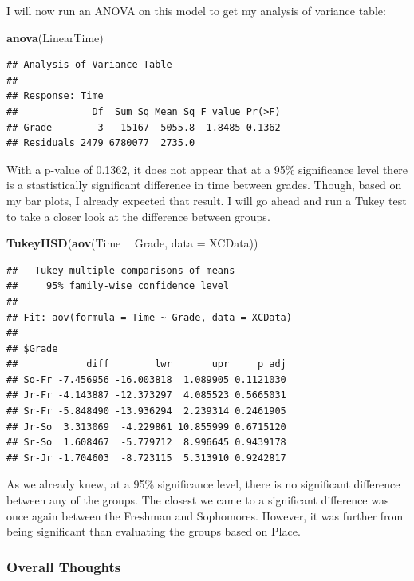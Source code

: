 \documentclass[
]{article}
\newenvironment{Shaded}{\begin{snugshade}}{\end{snugshade}}
\newcommand{\DataTypeTok}[1]{\textcolor[rgb]{0.13,0.29,0.53}{#1}}
\newcommand{\KeywordTok}[1]{\textcolor[rgb]{0.13,0.29,0.53}{\textbf{#1}}}
\newcommand{\NormalTok}[1]{#1}
\newcommand{\OperatorTok}[1]{\textcolor[rgb]{0.81,0.36,0.00}{\textbf{#1}}}
\newcommand{\StringTok}[1]{\textcolor[rgb]{0.31,0.60,0.02}{#1}}
\begin{document}
I will now run an ANOVA on this model to get my analysis of variance
table:

\begin{Shaded}
\begin{Highlighting}[]
\KeywordTok{anova}\NormalTok{(LinearTime)}
\end{Highlighting}
\end{Shaded}

\begin{verbatim}
## Analysis of Variance Table
## 
## Response: Time
##             Df  Sum Sq Mean Sq F value Pr(>F)
## Grade        3   15167  5055.8  1.8485 0.1362
## Residuals 2479 6780077  2735.0
\end{verbatim}

With a p-value of 0.1362, it does not appear that at a 95\% significance
level there is a stastistically significant difference in time between
grades. Though, based on my bar plots, I already expected that result. I
will go ahead and run a Tukey test to take a closer look at the
difference between groups.

\begin{Shaded}
\begin{Highlighting}[]
\KeywordTok{TukeyHSD}\NormalTok{(}\KeywordTok{aov}\NormalTok{(Time }\OperatorTok{~}\StringTok{ }\NormalTok{Grade, }\DataTypeTok{data =}\NormalTok{ XCData))}
\end{Highlighting}
\end{Shaded}

\begin{verbatim}
##   Tukey multiple comparisons of means
##     95% family-wise confidence level
## 
## Fit: aov(formula = Time ~ Grade, data = XCData)
## 
## $Grade
##            diff        lwr       upr     p adj
## So-Fr -7.456956 -16.003818  1.089905 0.1121030
## Jr-Fr -4.143887 -12.373297  4.085523 0.5665031
## Sr-Fr -5.848490 -13.936294  2.239314 0.2461905
## Jr-So  3.313069  -4.229861 10.855999 0.6715120
## Sr-So  1.608467  -5.779712  8.996645 0.9439178
## Sr-Jr -1.704603  -8.723115  5.313910 0.9242817
\end{verbatim}

As we already knew, at a 95\% significance level, there is no
significant difference between any of the groups. The closest we came to
a significant difference was once again between the Freshman and
Sophomores. However, it was further from being significant than
evaluating the groups based on Place.

\hypertarget{overall-thoughts}{%
\subsubsection{Overall Thoughts}\label{overall-thoughts}}
\end{document}
